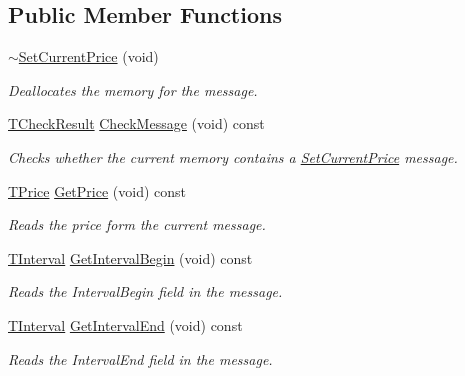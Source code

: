 \subsection*{Public Member Functions}
\begin{DoxyCompactItemize}
\item 
\hyperlink{class_terra_swarm_1_1_synchronous_1_1_set_current_price_ab9188b1b4eeed0a333ec879acac1cc30}{$\sim$\-Set\-Current\-Price} (void)
\begin{DoxyCompactList}\small\item\em Deallocates the memory for the message. \end{DoxyCompactList}\item 
\hyperlink{class_terra_swarm_1_1_synchronous_1_1_set_current_price_aeed4ef4c867719626ede15e2f8718436}{T\-Check\-Result} \hyperlink{class_terra_swarm_1_1_synchronous_1_1_set_current_price_a01c2cf6549b92e8066d2f57b753ce8b2}{Check\-Message} (void) const 
\begin{DoxyCompactList}\small\item\em Checks whether the current memory contains a \hyperlink{class_terra_swarm_1_1_synchronous_1_1_set_current_price}{Set\-Current\-Price} message. \end{DoxyCompactList}\item 
\hyperlink{class_terra_swarm_1_1_synchronous_1_1_set_current_price_a2ed14f2a90070d19a70183bb63e7708e}{T\-Price} \hyperlink{class_terra_swarm_1_1_synchronous_1_1_set_current_price_aafd75de81420798be1243a02cd8ab7a2}{Get\-Price} (void) const 
\begin{DoxyCompactList}\small\item\em Reads the price form the current message. \end{DoxyCompactList}\item 
\hyperlink{class_terra_swarm_1_1_synchronous_1_1_set_current_price_aa87902078a0788d13ef70b899d83f4d3}{T\-Interval} \hyperlink{class_terra_swarm_1_1_synchronous_1_1_set_current_price_a35a5775c7987c4b1882edfa730f36e7b}{Get\-Interval\-Begin} (void) const 
\begin{DoxyCompactList}\small\item\em Reads the Interval\-Begin field in the message. \end{DoxyCompactList}\item 
\hyperlink{class_terra_swarm_1_1_synchronous_1_1_set_current_price_aa87902078a0788d13ef70b899d83f4d3}{T\-Interval} \hyperlink{class_terra_swarm_1_1_synchronous_1_1_set_current_price_a267e167ab05f6dd602a202fcc5d7efdf}{Get\-Interval\-End} (void) const 
\begin{DoxyCompactList}\small\item\em Reads the Interval\-End field in the message. \end{DoxyCompactList}\end{DoxyCompactItemize}
